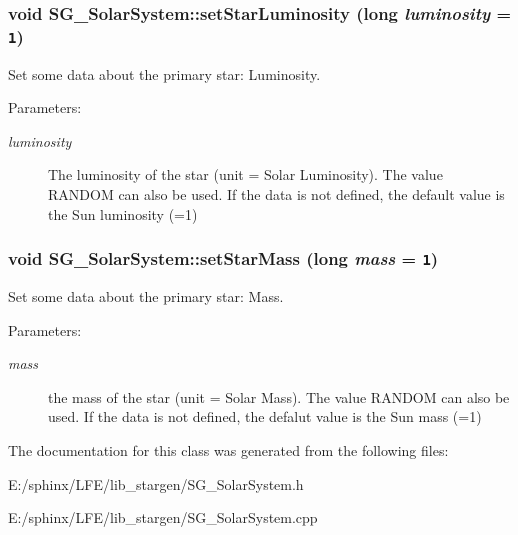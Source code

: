 \subsubsection{\setlength{\rightskip}{0pt plus 5cm}void SG\_\-Solar\-System::set\-Star\-Luminosity (long {\em luminosity} = {\tt 1})}\label{class_s_g___solar_system_a6}


Set some data about the primary star: Luminosity. 

\begin{Desc}
\item[Parameters:]
\begin{description}
\item[{\em luminosity}]The luminosity of the star (unit = Solar Luminosity). The value RANDOM can also be used. If the data is not defined, the default value is the Sun luminosity (=1) \end{description}
\end{Desc}
\subsubsection{\setlength{\rightskip}{0pt plus 5cm}void SG\_\-Solar\-System::set\-Star\-Mass (long {\em mass} = {\tt 1})}\label{class_s_g___solar_system_a5}


Set some data about the primary star: Mass. 

\begin{Desc}
\item[Parameters:]
\begin{description}
\item[{\em mass}]the mass of the star (unit = Solar Mass). The value RANDOM can also be used. If the data is not defined, the defalut value is the Sun mass (=1) \end{description}
\end{Desc}


The documentation for this class was generated from the following files:\begin{CompactItemize}
\item 
E:/sphinx/LFE/lib\_\-stargen/SG\_\-Solar\-System.h\item 
E:/sphinx/LFE/lib\_\-stargen/SG\_\-Solar\-System.cpp\end{CompactItemize}
